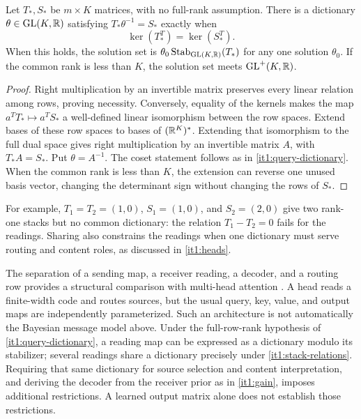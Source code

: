 Let $T_*,S_*$ be $m\times K$ matrices, with no full-rank assumption. There is a dictionary $\theta\in\mathrm{GL}(K,\mathbb R)$ satisfying $T_*\theta^{-1}=S_*$ exactly when
\begin{equation}
\ker(T_*^T)=\ker(S_*^T).
\label{it1:stack-relations}
\end{equation}
When this holds, the solution set is $\theta_0\operatorname{Stab}_{\mathrm{GL}(K,\mathbb R)}(T_*)$ for any one solution $\theta_0$. If the common rank is less than $K$, the solution set meets $\mathrm{GL}^+(K,\mathbb R)$.
\begin{proof}
Right multiplication by an invertible matrix preserves every linear relation among rows, proving necessity. Conversely, equality of the kernels makes the map $a^TT_*\mapsto a^TS_*$ a well-defined linear isomorphism between the row spaces. Extend bases of these row spaces to bases of $(\mathbb R^K)^*$. Extending that isomorphism to the full dual space gives right multiplication by an invertible matrix $A$, with $T_*A=S_*$. Put $\theta=A^{-1}$. The coset statement follows as in \cref{it1:query-dictionary}. When the common rank is less than $K$, the extension can reverse one unused basis vector, changing the determinant sign without changing the rows of $S_*$.
\end{proof}
For example, $T_1=T_2=(1,0)$, $S_1=(1,0)$, and $S_2=(2,0)$ give two rank-one stacks but no common dictionary: the relation $T_1-T_2=0$ fails for the readings. Sharing also constrains the readings when one dictionary must serve routing and content roles, as discussed in \cref{it1:heads}.

The separation of a sending map, a receiver reading, a decoder, and a routing row provides a structural comparison with multi-head attention \citep{Vaswani2017}. A head reads a finite-width code and routes sources, but the usual query, key, value, and output maps are independently parameterized. Such an architecture is not automatically the Bayesian message model above. Under the full-row-rank hypothesis of \cref{it1:query-dictionary}, a reading map can be expressed as a dictionary modulo its stabilizer; several readings share a dictionary precisely under \cref{it1:stack-relations}. Requiring that same dictionary for source selection and content interpretation, and deriving the decoder from the receiver prior as in \cref{it1:gain}, imposes additional restrictions. A learned output matrix alone does not establish those restrictions.


